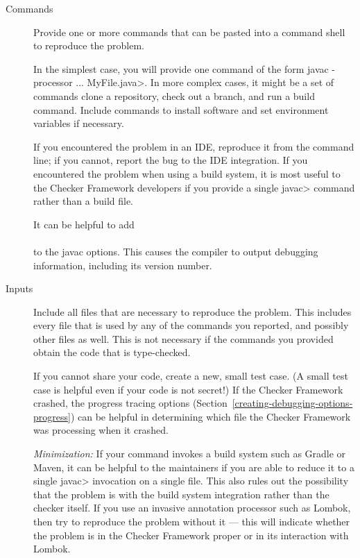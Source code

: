 \begin{description}
\item[Commands]
  Provide one or more commands that can be pasted into a command shell to
  reproduce the problem.

  In the simplest case, you will provide one command of
  the form \<javac -processor ... MyFile.java>.  In more complex cases, it
  might be a set of commands clone a repository, check out a branch, and
  run a build command.  Include commands to install software and set
  environment variables if necessary.

  If you encountered the problem in an IDE, reproduce it from the command
  line; if you cannot, report the bug to the IDE integration.
  If you encountered the problem when using a build system, it is most
  useful to the Checker Framework developers if you provide a single
  \<javac> command rather than a build file.

  It can be helpful to add \\
   \\
  to the javac options.  This causes the
  compiler to output debugging information, including its version number.

\item[Inputs]
  Include all files that are necessary to reproduce the problem.  This
  includes every file that is used by any of the commands you reported, and
  possibly other files as well.  This is not necessary if the commands you
  provided obtain the code that is type-checked.

  If you cannot share your code, create a new, small test case.  (A small
  test case is helpful even if your code is not secret!)  If the Checker
  Framework crashed, the progress tracing options
  (Section~\ref{creating-debugging-options-progress}) can be helpful in
  determining which file the Checker Framework was processing when it
  crashed.

  \emph{Minimization:}
  If your command invokes a build system such as Gradle or Maven, it can be
  helpful to the maintainers if you are able to reduce it to a single
  \<javac> invocation on a single file.
  This also rules out the possibility that the problem is with the build system
  integration rather than the checker itself.
  If you use an invasive
  annotation processor such as Lombok, then try to reproduce the problem
  without it --- this will indicate whether the problem is in the Checker
  Framework proper or in its interaction with Lombok.


\end{description}
